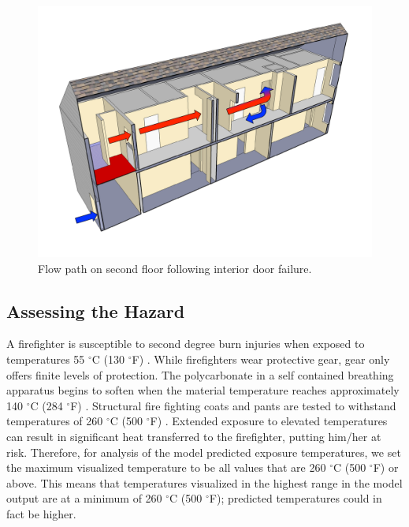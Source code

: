 \documentclass[11pt,oneside]{book}
\begin{document}
\begin{figure}[h!]
\centering
\includegraphics[width=.7\textwidth]{../Figures/ChicagoFlow}
\caption{Flow path on second floor following interior door failure.}
\label{fig:flowpath_1}
\end{figure}

\subsection{Assessing the Hazard}

A firefighter is susceptible to second degree burn injuries when exposed to temperatures 55 $^{\circ}$C (130 $^{\circ}$F) \cite{designation2003c}. While firefighters wear protective gear, gear only offers finite levels of protection. The polycarbonate in a self contained breathing apparatus begins to soften when the material temperature reaches approximately 140 $^{\circ}$C (284 $^{\circ}$F) \cite{mensch2011emergency}. Structural fire fighting coats and pants are tested to withstand temperatures of 260 $^{\circ}$C (500 $^{\circ}$F) \cite{nfpa2013standard}. Extended exposure to elevated temperatures can result in significant heat transferred to the firefighter, putting him/her at risk. Therefore, for analysis of the model predicted exposure temperatures, we set the maximum visualized temperature to be all values that are 260 $^{\circ}$C (500 $^{\circ}$F) or above. This means that temperatures visualized in the highest range in the model output are at a minimum of 260 $^{\circ}$C (500 $^{\circ}$F); predicted temperatures could in fact be higher.
\end{document}
